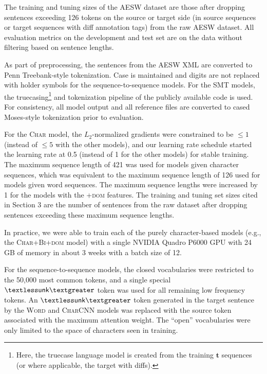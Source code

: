 \documentclass[11pt,letterpaper]{article}
\begin{document}
The training and tuning sizes of the AESW dataset are those after dropping sentences exceeding 126 tokens on the source or target side (in source sequences or target sequences with diff annotation tags) from the raw AESW dataset. All evaluation metrics on the development and test set are on the data without filtering based on sentence lengths.

As part of preprocessing, the sentences from the AESW XML are converted to Penn Treebank-style tokenization. Case is maintained and digits are not replaced with holder symbols for the sequence-to-sequence models. For the \textsc{SMT} models, the truecasing\footnote{Here, the truecase language model is created from the training $\mathbf{t}$ sequences (or where applicable, the target with diffs).} and tokenization pipeline of the publicly available code is used. For consistency, all model output and all reference files are converted to cased Moses-style tokenization prior to evaluation. 

For the \textsc{Char} model, the $L_2$-normalized gradients were constrained to be $\le 1$ (instead of $\le 5$ with the other models), and our learning rate schedule started the learning rate at 0.5 (instead of 1 for the other models) for stable training. The maximum sequence length of 421 was used for models given character sequences, which was equivalent to the maximum sequence length of 126 used for models given word sequences. The maximum sequence lengths were increased by 1 for the models with the \textsc{+dom} features. The training and tuning set sizes cited in Section 3 are the number of sentences from the raw dataset after dropping sentences exceeding these maximum sequence lengths.

In practice, we were able to train each of the purely character-based models (e.g., the \textsc{Char+Bi+dom} model) with a single NVIDIA Quadro P6000 GPU with 24 GB of memory in about 3 weeks with a batch size of 12.

For the sequence-to-sequence models, the closed vocabularies were restricted to the 50,000 most common tokens, and a single special $\mathsf{ \textless unk\textgreater}$ token was used for all remaining low frequency tokens. An $\mathsf{ \textless unk\textgreater}$ token generated in the target sentence by the \textsc{Word} and \textsc{CharCNN} models was replaced with the source token associated with the maximum attention weight. The ``open'' vocabularies were only limited to the space of characters seen in training.
\end{document}
